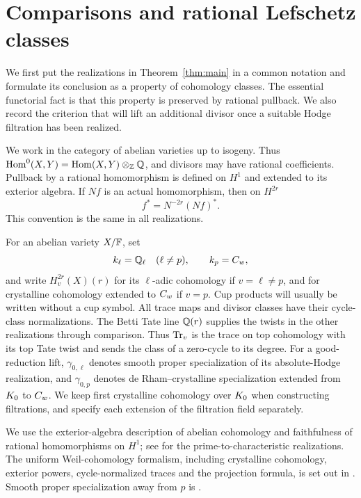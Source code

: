 \section{Comparisons and rational Lefschetz classes}
\label{sec:preliminaries}

We first put the realizations in Theorem~\ref{thm:main} in a common
notation and formulate its conclusion as a property of cohomology classes.
The essential functorial fact is that this property is preserved by rational
pullback. We also record the criterion that will lift an additional divisor
once a suitable Hodge filtration has been realized.

We work in the category of abelian varieties up to isogeny. Thus
\(\operatorname{Hom}^0(X,Y)=\operatorname{Hom}(X,Y)\otimes_\mathbb Z\mathbb Q\), and divisors may have rational
coefficients. Pullback by a rational homomorphism is defined on \(H^1\)
and extended to its exterior algebra. If \(Nf\) is an actual homomorphism,
then on \(H^{2r}\)
\begin{equation}\label{eq:rational-pullback}
 f^*=N^{-2r}(Nf)^*.
\end{equation}
This convention is the same in all realizations.

For an abelian variety \(X/\mathbb F\), set
\[
 k_\ell=\mathbb Q_\ell\quad(\ell\ne p),\qquad k_p=C_w,
\]
and write \(H_v^{2r}(X)(r)\) for its \(\ell\)-adic cohomology if
\(v=\ell\ne p\), and for crystalline cohomology extended to \(C_w\)
if \(v=p\). Cup products will usually be written without a cup symbol.
All trace maps and divisor classes have their cycle-class normalizations.
The Betti Tate line \(\mathbb Q(r)\) supplies the twists in the other
realizations through comparison. Thus \(\operatorname{Tr}_v\) is the trace on top
cohomology with its top Tate twist and sends the class of a zero-cycle to
its degree. For a good-reduction lift, \(\gamma_{0,\ell}\) denotes
smooth proper specialization of its absolute-Hodge realization, and
\(\gamma_{0,p}\) denotes de Rham--crystalline specialization extended
from \(K_0\) to \(C_w\). We keep first crystalline cohomology
over \(K_0\) when constructing filtrations, and specify each
extension of the filtration field separately.

We use the exterior-algebra description of abelian cohomology and
faithfulness of rational homomorphisms on \(H^1\); see
\cite[Theorems~12.5 and~15.1]{MilneAV} for the prime-to-characteristic
realizations. The uniform Weil-cohomology formalism, including
crystalline cohomology, exterior powers, cycle-normalized traces and
the projection formula, is set out in
\cite[Section~1 and Appendix, Proposition~(A.2)]{Milne1999}. Smooth
proper specialization away from \(p\) is
\cite[Theorem~20.4]{MilneLEC}.

